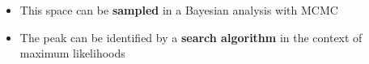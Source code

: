 \begin{frame}[plain]
\begin{columns}
\end{columns}

\small{}
\begin{itemize}
\item This space can be \textbf{sampled} in a Bayesian analysis with MCMC
\item The peak can be identified by a \textbf{search algorithm} in the context of maximum likelihoods
\end{itemize}

\end{frame}


